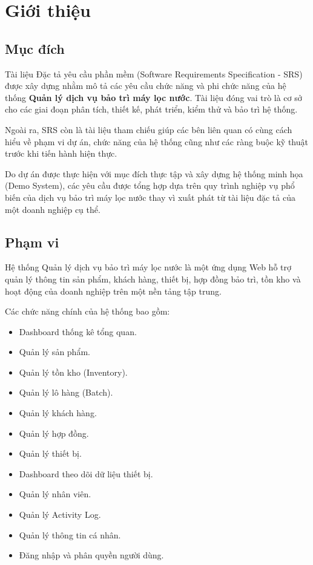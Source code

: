 
\chapter{Giới thiệu}

\section{Mục đích}

Tài liệu Đặc tả yêu cầu phần mềm (Software Requirements Specification - SRS) được xây dựng nhằm mô tả các yêu cầu chức năng và phi chức năng của hệ thống \textbf{Quản lý dịch vụ bảo trì máy lọc nước}. Tài liệu đóng vai trò là cơ sở cho các giai đoạn phân tích, thiết kế, phát triển, kiểm thử và bảo trì hệ thống.

Ngoài ra, SRS còn là tài liệu tham chiếu giúp các bên liên quan có cùng cách hiểu về phạm vi dự án, chức năng của hệ thống cũng như các ràng buộc kỹ thuật trước khi tiến hành hiện thực.

Do dự án được thực hiện với mục đích thực tập và xây dựng hệ thống minh họa (Demo System), các yêu cầu được tổng hợp dựa trên quy trình nghiệp vụ phổ biến của dịch vụ bảo trì máy lọc nước thay vì xuất phát từ tài liệu đặc tả của một doanh nghiệp cụ thể.

\section{Phạm vi}

Hệ thống Quản lý dịch vụ bảo trì máy lọc nước là một ứng dụng Web hỗ trợ quản lý thông tin sản phẩm, khách hàng, thiết bị, hợp đồng bảo trì, tồn kho và hoạt động của doanh nghiệp trên một nền tảng tập trung.

Các chức năng chính của hệ thống bao gồm:

\begin{itemize}
    \item Dashboard thống kê tổng quan.
    \item Quản lý sản phẩm.
    \item Quản lý tồn kho (Inventory).
    \item Quản lý lô hàng (Batch).
    \item Quản lý khách hàng.
    \item Quản lý hợp đồng.
    \item Quản lý thiết bị.
    \item Dashboard theo dõi dữ liệu thiết bị.
    \item Quản lý nhân viên.
    \item Quản lý Activity Log.
    \item Quản lý thông tin cá nhân.
    \item Đăng nhập và phân quyền người dùng.
\end{itemize}



